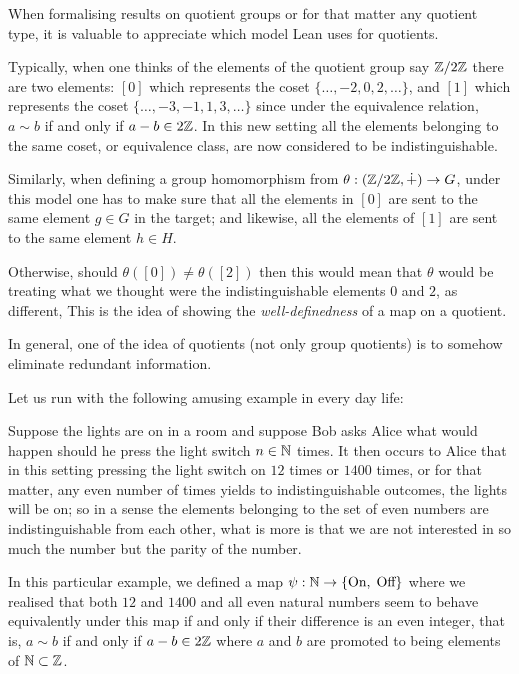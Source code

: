     \begin{remark}
    When formalising results on quotient groups or for that matter any quotient type, it is valuable to appreciate which model Lean uses for quotients. 
    
    Typically, when one thinks of the elements of the quotient group say $\mathbb{Z}/2\mathbb{Z}$ there are two elements: 
    $[0]$ which represents the coset $\{\ldots, -2, 0, 2, \ldots\}$, and $[1]$ which represents the coset $\{\ldots, -3, -1, 1, 3, \ldots\}$
    since under the equivalence relation, $a \sim b$ if and only if $a - b \in 2\mathbb{Z}$. In this new setting all the elements belonging to the same coset, 
    or equivalence class, are now considered to be indistinguishable.

    Similarly, when defining a group homomorphism from $\theta : (\mathbb{Z} /2\mathbb{Z}, \dot{+}) \rightarrow G$, under this model one has to make sure that
    all the elements in $[0]$ are sent to the same element $g \in G$ in the target; and likewise, all the elements of $[1]$ are sent to the same element $h \in H$.

    Otherwise, should $\theta([0]) \ne \theta([2])$ then this would mean that $\theta$ would be treating what we thought were the indistinguishable elements $0$ and $2$, as different,
    This is the idea of showing the \textit{well-definedness} of a map on a quotient.

    In general, one of the idea of quotients (not only group quotients) is to somehow eliminate redundant information.

    Let us run with the following amusing example in every day life:
    
    Suppose the lights are on in a room and suppose Bob asks Alice what would happen should he press the light switch $n \in \mathbb{N}$ times. It then occurs to
    Alice that in this setting pressing the light switch on $12$ times or $1400$ times, or for that matter, any even number of times yields to indistinguishable outcomes,
     the lights will be on; so in a sense the elements belonging to the set of even numbers are indistinguishable from each other, 
     what is more is that we are not interested in so much the number but the parity of the number.

    In this particular example, we defined a map $\psi : \mathbb{N} \rightarrow \{\text{On}, \; \text{Off}\}$ where we realised
    that both $12$ and $1400$ and all even natural numbers seem to behave equivalently under this map if and only if their difference is an even integer,
    that is, $a \sim b$ if and only if $a - b \in 2\mathbb{Z}$ where $a$ and $b$ are promoted to being elements of $\mathbb{N} \subset \mathbb{Z}$.    
    

\end{remark}
